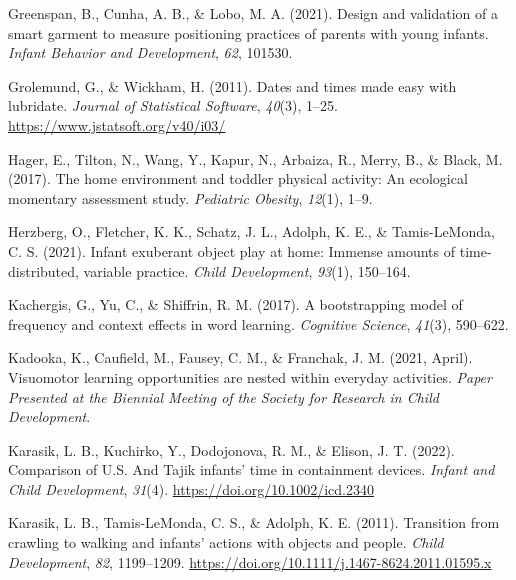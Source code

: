 \documentclass[
  man]{apa6}
\newlength{\cslhangindent}
\newlength{\cslentryspacingunit} %
\newenvironment{CSLReferences}[2] %
 {%
  \setlength{\parindent}{0pt}
  \ifodd #1
  \let\oldpar\par
  \def\par{\hangindent=\cslhangindent\oldpar}
  \fi
  \setlength{\parskip}{#2\cslentryspacingunit}
 }%
 {}
\begin{document}
\begin{CSLReferences}{1}{0}
\leavevmode{}%
Greenspan, B., Cunha, A. B., \& Lobo, M. A. (2021). Design and validation of a smart garment to measure positioning practices of parents with young infants. \emph{Infant Behavior and Development}, \emph{62}, 101530.

\leavevmode{}%
Grolemund, G., \& Wickham, H. (2011). Dates and times made easy with {lubridate}. \emph{Journal of Statistical Software}, \emph{40}(3), 1--25. \url{https://www.jstatsoft.org/v40/i03/}

\leavevmode{}%
Hager, E., Tilton, N., Wang, Y., Kapur, N., Arbaiza, R., Merry, B., \& Black, M. (2017). The home environment and toddler physical activity: An ecological momentary assessment study. \emph{Pediatric Obesity}, \emph{12}(1), 1--9.

\leavevmode{}%
Herzberg, O., Fletcher, K. K., Schatz, J. L., Adolph, K. E., \& Tamis-LeMonda, C. S. (2021). Infant exuberant object play at home: Immense amounts of time-distributed, variable practice. \emph{Child Development}, \emph{93}(1), 150--164.

\leavevmode{}%
Kachergis, G., Yu, C., \& Shiffrin, R. M. (2017). A bootstrapping model of frequency and context effects in word learning. \emph{Cognitive Science}, \emph{41}(3), 590--622.

\leavevmode{}%
Kadooka, K., Caufield, M., Fausey, C. M., \& Franchak, J. M. (2021, April). Visuomotor learning opportunities are nested within everyday activities. \emph{Paper Presented at the Biennial Meeting of the Society for Research in Child Development}.

\leavevmode{}%
Karasik, L. B., Kuchirko, Y., Dodojonova, R. M., \& Elison, J. T. (2022). Comparison of {U.S.} And {Tajik} infants' time in containment devices. \emph{Infant and Child Development}, \emph{31}(4). \url{https://doi.org/10.1002/icd.2340}

\leavevmode{}%
Karasik, L. B., Tamis-LeMonda, C. S., \& Adolph, K. E. (2011). Transition from crawling to walking and infants' actions with objects and people. \emph{Child Development}, \emph{82}, 1199--1209. \url{https://doi.org/10.1111/j.1467-8624.2011.01595.x}


\end{CSLReferences}
\end{document}
